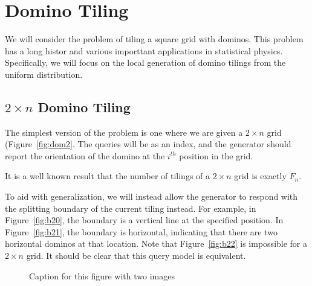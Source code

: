 \section{Domino Tiling}
We will consider the problem of tiling a square grid with dominos.
This problem has a long histor and various importtant applications in statistical physics.
Specifically, we will focus on the local generation of domino tilings from the uniform distribution.

\subsection{$2\times n$ Domino Tiling}
The simplest version of the problem is one where we are given a $2\times n$ grid (Figure~\ref{fig:dom2}.
The queries will be as an index, and the generator should report the orientation of the domino at the $i^{th}$ position in the grid.

It is a well known result  that the number of tilings of a $2\times n$ grid is exactly $F_n$.

To aid with generalization, we will instead allow the generator to respond with the splitting boundary of the current tiling instead.
For example, in Figure~\ref{fig:b20}, the boundary is a vertical line at the specified position.
In Figure~\ref{fig:b21}, the boundary is horizontal, indicating that there are two horizontal dominos at that location.
Note that Figure~\ref{fig:b22} is impossible for a $2\times n$ grid.
It should be clear that this query model is equivalent.

\begin{figure}[h]
    \centering

    \caption{Caption for this figure with two images}
    \label{fig:boundary2}
\end{figure}

